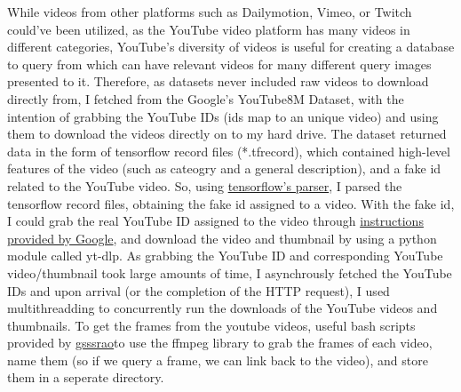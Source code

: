\documentclass[10pt,twocolumn]{article}
\begin{document}
While videos from other platforms such as Dailymotion, Vimeo, or Twitch could've been utilized, as the YouTube video platform has many videos in different categories, YouTube's diversity of videos is useful for creating a database to query from which can have relevant videos for many different query images presented to it. Therefore, as datasets never included raw videos to download directly from, I fetched from the Google's YouTube8M Dataset, with the intention of grabbing the YouTube IDs (ids map to an unique video) and using them to download the videos directly on to my hard drive. The dataset returned data in the form of tensorflow record files (*.tfrecord), which contained high-level features of the video (such as cateogry and a general description), and a fake id related to the YouTube video. So, using \href{https://www.tensorflow.org/api_docs/python/tf/io}{tensorflow's parser}, I parsed the tensorflow record files, obtaining the fake id assigned to a video. With the fake id, I could grab the real YouTube ID assigned to the video through \href{https://research.google.com/youtube8m/video_id_conversion.html}{instructions provided by Google}, and download the video and thumbnail by using a python module called yt-dlp. As grabbing the YouTube ID and corresponding YouTube video/thumbnail took large amounts of time, I asynchrously fetched the YouTube IDs and upon arrival (or the completion of the HTTP request), I used multithreadding to concurrently run the downloads of the YouTube videos and thumbnails. To get the frames from the youtube videos, useful bash scripts provided by \href{https://github.com/gsssrao/youtube-8m-videos-frames}{gsssrao}to use the ffmpeg library to grab the frames of each video, name them (so if we query a frame, we can link back to the video), and store them in a seperate directory.
\end{document}
